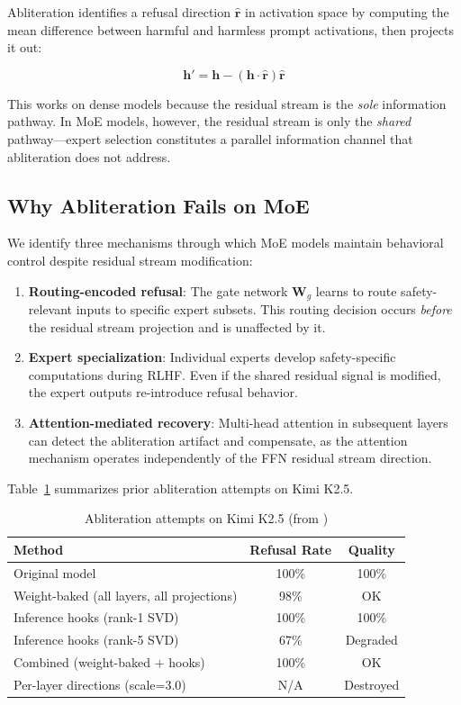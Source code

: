 \documentclass[11pt,a4paper]{article}
\begin{document}
Abliteration \citep{arditi2024refusal} identifies a refusal direction $\hat{\mathbf{r}}$ in activation space by computing the mean difference between harmful and harmless prompt activations, then projects it out:

$$\mathbf{h}' = \mathbf{h} - (\mathbf{h} \cdot \hat{\mathbf{r}}) \hat{\mathbf{r}}$$

This works on dense models because the residual stream is the \textit{sole} information pathway. In MoE models, however, the residual stream is only the \textit{shared} pathway—expert selection constitutes a parallel information channel that abliteration does not address.

\subsection{Why Abliteration Fails on MoE}

We identify three mechanisms through which MoE models maintain behavioral control despite residual stream modification:

\begin{enumerate}
    \item \textbf{Routing-encoded refusal}: The gate network $\mathbf{W}_g$ learns to route safety-relevant inputs to specific expert subsets. This routing decision occurs \textit{before} the residual stream projection and is unaffected by it.

    \item \textbf{Expert specialization}: Individual experts develop safety-specific computations during RLHF. Even if the shared residual signal is modified, the expert outputs re-introduce refusal behavior.

    \item \textbf{Attention-mediated recovery}: Multi-head attention in subsequent layers can detect the abliteration artifact and compensate, as the attention mechanism operates independently of the FFN residual stream direction.
\end{enumerate}

Table~\ref{tab:abliteration_results} summarizes prior abliteration attempts on Kimi K2.5.

\begin{table}[h]
\centering
\caption{Abliteration attempts on Kimi K2.5 (from \citet{hamsaomar2025})}
\label{tab:abliteration_results}
\begin{tabular}{lcc}
\toprule
\textbf{Method} & \textbf{Refusal Rate} & \textbf{Quality} \\
\midrule
Original model & 100\% & 100\% \\
Weight-baked (all layers, all projections) & 98\% & OK \\
Inference hooks (rank-1 SVD) & 100\% & 100\% \\
Inference hooks (rank-5 SVD) & 67\% & Degraded \\
Combined (weight-baked + hooks) & 100\% & OK \\
Per-layer directions (scale=3.0) & N/A & Destroyed \\
\bottomrule
\end{tabular}
\end{table}
\end{document}
